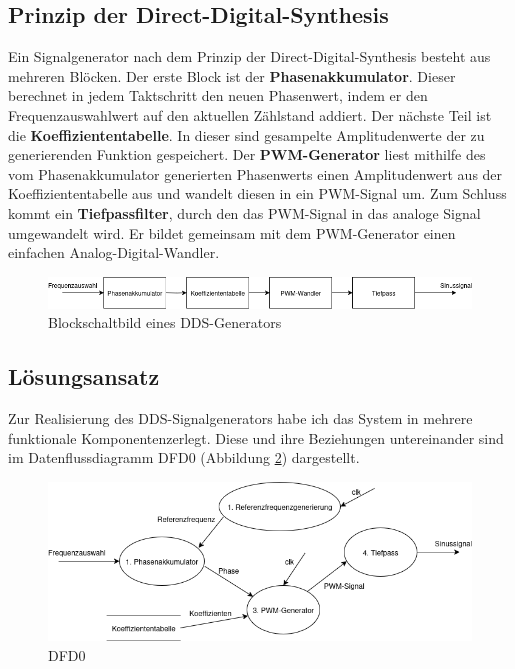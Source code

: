 \subsection{Prinzip der Direct-Digital-Synthesis}
\label{subsec:prinzip}
Ein Signalgenerator nach dem Prinzip der Direct-Digital-Synthesis besteht aus mehreren Blöcken.
Der erste Block ist der \textbf{Phasenakkumulator}. Dieser berechnet in jedem Taktschritt den neuen Phasenwert,
indem er den Frequenzauswahlwert auf den aktuellen Zählstand addiert.
Der nächste Teil ist die \textbf{Koeffiziententabelle}. In dieser sind gesampelte Amplitudenwerte der zu 
generierenden Funktion gespeichert.
Der \textbf{PWM-Generator} liest mithilfe des vom Phasenakkumulator generierten
Phasenwerts einen Amplitudenwert aus der Koeffiziententabelle aus und wandelt diesen in ein PWM-Signal um.
Zum Schluss kommt ein \textbf{Tiefpassfilter}, durch den das PWM-Signal in das analoge Signal umgewandelt wird.
Er bildet gemeinsam mit dem PWM-Generator einen einfachen Analog-Digital-Wandler.

\begin{figure}[htbp]
    \centering
    \includegraphics[width=\linewidth]{img/blockschaltbild.png}
    \caption{Blockschaltbild eines DDS-Generators}
    \label{fig:blockschaltbild}
\end{figure}

\subsection{Lösungsansatz}
\label{subsec:lösungsansatz}
Zur Realisierung des DDS-Signalgenerators habe ich das System in mehrere funktionale Komponentenzerlegt.
Diese und ihre Beziehungen untereinander sind im Datenflussdiagramm DFD0 (Abbildung \ref{fig:dfd0}) dargestellt.

\begin{figure}[htbp]
    \centering
    \includegraphics[width=\linewidth]{img/dfd.png}
    \caption{DFD0}
    \label{fig:dfd0}
\end{figure}

